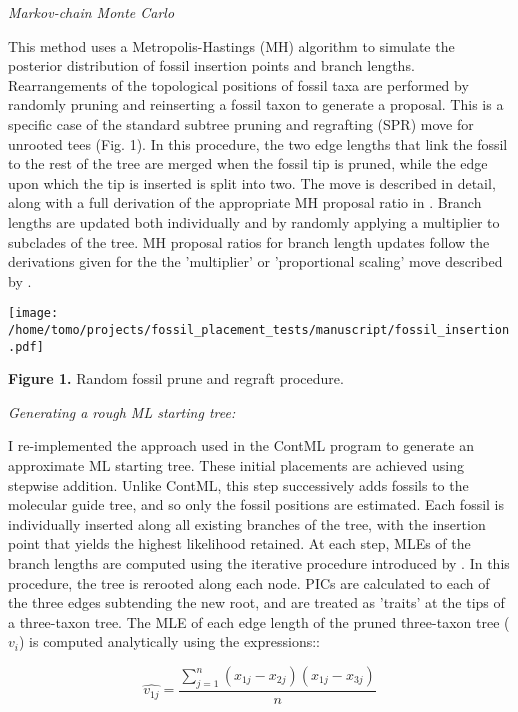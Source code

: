 \documentclass[12pt]{article}
\begin{document}
\noindent\emph{Markov-chain Monte Carlo}

 This method uses a
 Metropolis-Hastings (MH) algorithm \citep{hastings1970monte} to simulate the posterior distribution of fossil insertion points
and branch lengths. Rearrangements of the topological positions of fossil taxa are performed by randomly pruning
and reinserting a fossil taxon to generate a proposal. This is a
specific case of the standard subtree pruning and regrafting (SPR) move
for unrooted tees (Fig. 1). In this procedure, the two edge lengths that link the fossil to the rest of the tree are merged when the fossil tip is pruned,
while the edge upon which the tip is inserted is split into two. The move is described in detail, along with a full derivation of the appropriate
MH proposal ratio in \citet[p. 287]{yang2014molecular}.  Branch lengths are updated both individually and by randomly applying a
multiplier to subclades of the tree. MH proposal ratios for branch length updates follow the derivations given for the  the 'multiplier' or 'proportional scaling'
 move described by \citet[p. 225]{yang2014molecular}.

\texttt{[image: /home/tomo/projects/fossil\_placement\_tests/manuscript/fossil\_insertion.pdf]}

\textbf{Figure 1.} Random fossil prune and regraft procedure. 


\noindent\emph{Generating a rough ML starting tree:}

I re-implemented the approach used in the ContML program to generate an approximate ML starting tree. These initial placements are
achieved using stepwise addition. Unlike ContML, this step successively adds fossils to the molecular guide tree, and so only the fossil positions are estimated. 
Each fossil is individually inserted along all existing branches of the tree, with the insertion point that
yields the highest likelihood retained. At each step, MLEs of the branch
lengths are computed using the iterative procedure introduced by
\citep{felsenstein1981evolutionary}. In this procedure, the tree is rerooted along each
node. PICs are calculated to each of the three edges subtending the new
root, and are treated as 'traits' at the tips of a three-taxon tree. The MLE of each edge length of the pruned three-taxon tree  ($v_i$) is computed analytically
using the expressions::

\begin{equation}
 \hat{v_{1j}} =   \frac{\sum\limits_{j=1}^{n}(x_{1j}- x_{2j}) (x_{1j} - x_{3j}) }{n}
\end{equation}
\end{document}
